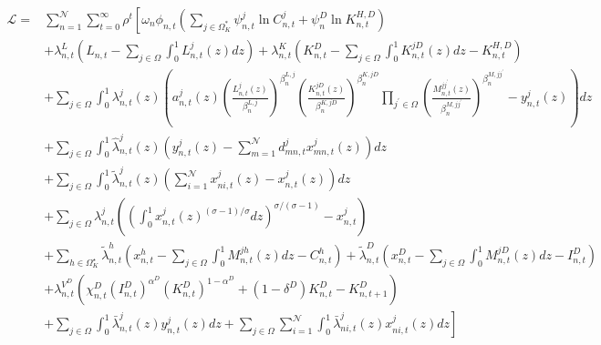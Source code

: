 \documentclass[12pt, bibtotoc, tablecaptionabove, figurecaptionabove, fleqn]{article}
\begin{document}
\begin{equation*}
\begin{aligned}
\mathcal{L}=& \sum_{n=1}^{\mathcal{N}} \sum_{t=0}^{\infty} \rho^{t}\left[\omega_{n} \phi_{n, t}\left(\sum_{j \in \Omega_{K}^{*}} \psi_{n, t}^{j} \ln C_{n, t}^{j}+ \psi^{D}_n \ln K_{n, t}^{H, D}\right)\right.\\
&+\lambda_{n, t}^{L}\left(L_{n, t}-\sum_{j \in \Omega} \int_{0}^{1} L_{n, t}^{j}(z) d z\right)+ \lambda_{n, t}^{K}\left(K_{n, t}^{D}-\sum_{j \in \Omega} \int_{0}^{1} K_{n, t}^{j D}(z) d z-K_{n, t}^{H, D}\right) \\
&+\sum_{j \in \Omega} \int_{0}^{1} \lambda_{n, t}^{j}(z)\left(a_{n, t}^{j}(z)\left(\frac{L_{n, t}^{j}(z)}{\beta_{n}^{L, j}}\right)^{\beta_{n}^{L, j}} \left(\frac{K_{n, t}^{j D}(z)}{\beta_{n}^{K, j D}}\right)^{\beta_{n}^{K, j D}} \prod_{j^{\prime} \in \Omega}\left(\frac{M_{n, t}^{j j^{\prime}}(z)}{\beta_{n}^{M, j j^{\prime}}}\right)^{\beta_{n}^{M, j j^{\prime}}}-y_{n, t}^{j}(z)\right) d z \\
&+\sum_{j \in \Omega} \int_{0}^{1} \hat{\lambda}_{n, t}^{j}(z)\left(y_{n, t}^{j}(z)-\sum_{m=1}^{\mathcal{N}} d_{m n, t}^{j} x_{m n, t}^{j}(z)\right) d z \\
&+\sum_{j \in \Omega} \int_{0}^{1} \tilde{\lambda}_{n, t}^{j}(z)\left(\sum_{i=1}^{\mathcal{N}} x_{n i, t}^{j}(z)-x_{n, t}^{j}(z)\right) d z \\
&+\sum_{j \in \Omega} \lambda_{n, t}^{j}\left(\left(\int_{0}^{1} x_{n, t}^{j}(z)^{(\sigma-1) / \sigma} d z\right)^{\sigma /(\sigma-1)}-x_{n, t}^{j}\right) \\
&+\sum_{h \in \Omega_K^{\star}}\tilde{\lambda}_{n, t}^{h}\left(x_{n, t}^{h}-\sum_{j \in \Omega} \int_{0}^{1} M_{n, t}^{j h}(z) d z-C_{n, t}^{h}\right)+\tilde{\lambda}_{n, t}^{D}\left(x_{n, t}^{D}-\sum_{j \in \Omega} \int_{0}^{1} M_{n, t}^{j D}(z) d z-I_{n, t}^{D}\right) \\
&+\lambda_{n, t}^{V^D}\left(\chi_{n, t}^{D}\left(I_{n, t}^{D}\right)^{\alpha^D}\left(K_{n, t}^{D}\right)^{1-\alpha^{D}}+\left(1-\delta^{D}\right) K_{n, t}^{D}-K_{n, t+1}^{D}\right) \\
&\left.+\sum_{j \in \Omega} \int_{0}^{1} \bar{\lambda}_{n, t}^{j}(z) y_{n, t}^{j}(z) d z+\sum_{j \in \Omega} \sum_{i=1}^{\mathcal{N}} \int_{0}^{1} \bar{\lambda}_{n i, t}^{j}(z) x_{n i, t}^{j}(z) d z\right]
\end{aligned}
\end{equation*}
\end{document}
